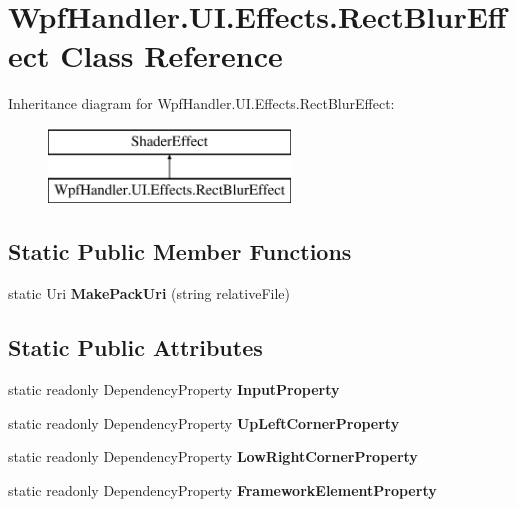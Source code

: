 \hypertarget{class_wpf_handler_1_1_u_i_1_1_effects_1_1_rect_blur_effect}{}\section{Wpf\+Handler.\+U\+I.\+Effects.\+Rect\+Blur\+Effect Class Reference}
\label{class_wpf_handler_1_1_u_i_1_1_effects_1_1_rect_blur_effect}
Inheritance diagram for Wpf\+Handler.\+U\+I.\+Effects.\+Rect\+Blur\+Effect\+:\begin{figure}[H]
\begin{center}
\leavevmode
\includegraphics[height=2.000000cm]{dd/d01/class_wpf_handler_1_1_u_i_1_1_effects_1_1_rect_blur_effect}
\end{center}
\end{figure}
\subsection*{Static Public Member Functions}
\begin{DoxyCompactItemize}
\item 
\mbox{\label{class_wpf_handler_1_1_u_i_1_1_effects_1_1_rect_blur_effect_a8556fe01d7ac0600f9f938067c9bc24f}} 
static Uri {\bfseries Make\+Pack\+Uri} (string relative\+File)
\end{DoxyCompactItemize}
\subsection*{Static Public Attributes}
\begin{DoxyCompactItemize}
\item 
static readonly Dependency\+Property {\bfseries Input\+Property}
\item 
static readonly Dependency\+Property {\bfseries Up\+Left\+Corner\+Property}
\item 
static readonly Dependency\+Property {\bfseries Low\+Right\+Corner\+Property}
\item 
static readonly Dependency\+Property {\bfseries Framework\+Element\+Property}
\end{DoxyCompactItemize}
